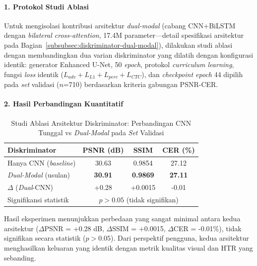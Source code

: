 \documentclass[12pt,a4paper]{article}
\begin{document}
\vspace{0.5em}

\paragraph{1. Protokol Studi Ablasi}

Untuk mengisolasi kontribusi arsitektur \textit{dual-modal} (cabang CNN+BiLSTM dengan \textit{bilateral cross-attention}, 17.4M parameter—detail spesifikasi arsitektur pada Bagian~\ref{subsubsec:diskriminator-dual-modal}), dilakukan studi ablasi dengan membandingkan dua varian diskriminator yang dilatih dengan konfigurasi identik: generator Enhanced U-Net, 50 \textit{epoch}, protokol \textit{curriculum learning}, fungsi \textit{loss} identik ($L_{adv} + L_{L1} + L_{perc} + L_{CTC}$), dan \textit{checkpoint epoch} 44 dipilih pada \textit{set} validasi ($n$=710) berdasarkan kriteria gabungan PSNR-CER.

\vspace{0.5em}

\paragraph{2. Hasil Perbandingan Kuantitatif}

\begin{table}[H]
\centering
\caption[Studi Ablasi Arsitektur Diskriminator: Perbandingan CNN]{Studi Ablasi Arsitektur Diskriminator: Perbandingan CNN Tunggal vs \textit{Dual-Modal} pada \textit{Set} Validasi}
\label{tab:diskriminator-ablasi}
\begin{tabular}{lccc}
\toprule
\textbf{Diskriminator} & \textbf{PSNR (dB)} & \textbf{SSIM} & \textbf{CER (\%)} \\
\midrule
Hanya CNN (\textit{baseline}) & 30.63 & 0.9854 & 27.12 \\
\textit{Dual-Modal} (usulan) & \textbf{30.91} & \textbf{0.9869} & \textbf{27.11} \\
\midrule
$\Delta$ (\textit{Dual}-CNN) & +0.28 & +0.0015 & -0.01 \\
Signifikansi statistik & \multicolumn{3}{c}{$p > 0.05$ (tidak signifikan)} \\
\bottomrule
\end{tabular}
\end{table}

Hasil eksperimen menunjukkan perbedaan yang sangat minimal antara kedua arsitektur ($\Delta$PSNR = +0.28 dB, $\Delta$SSIM = +0.0015, $\Delta$CER = -0.01\%), tidak signifikan secara statistik ($p > 0.05$). Dari perspektif pengguna, kedua arsitektur menghasilkan keluaran yang identik dengan metrik kualitas visual dan HTR yang sebanding.
\end{document}
